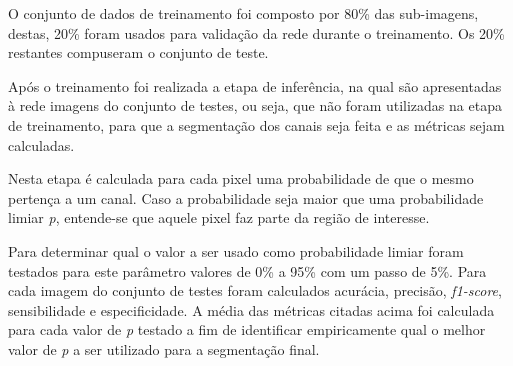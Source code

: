  O conjunto de dados de treinamento foi composto por 80\% das sub-imagens, destas, 20\% foram usados para validação da rede durante o treinamento. Os 20\% restantes compuseram o conjunto de teste.


 Após o treinamento foi realizada a etapa de inferência, na qual são apresentadas à rede imagens do conjunto de testes, ou seja, que não foram utilizadas na etapa de treinamento, para que a segmentação dos canais seja feita e as métricas sejam calculadas.

 Nesta etapa é calculada para cada pixel uma probabilidade de que o mesmo pertença a um canal. Caso a probabilidade seja maior que uma probabilidade limiar \textit{p}, entende-se que aquele pixel faz parte da região de interesse.

 Para determinar qual o valor a ser usado como probabilidade limiar foram testados para este parâmetro  valores de 0\% a 95\% com um passo de 5\%. Para cada imagem do conjunto de testes foram calculados acurácia, precisão, \textit{f1-score}, sensibilidade e especificidade. A média das métricas citadas acima foi calculada para cada valor de \textit{p} testado a fim de identificar empiricamente qual o melhor valor de \textit{p} a ser utilizado para a segmentação final.



